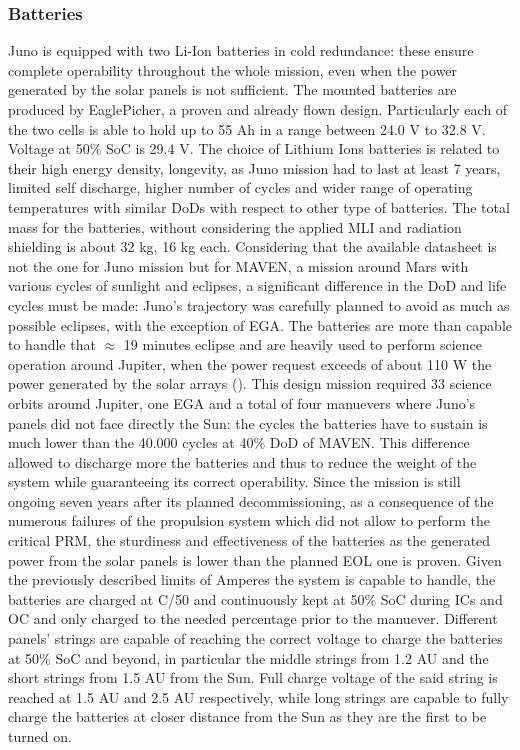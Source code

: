 \subsubsection{Batteries}
\label{subsubsec:Batteries}
Juno is equipped with two Li-Ion batteries in cold redundance: these ensure complete operability throughout the whole mission, even when the power generated by the solar panels is not sufficient.
\mref  
The mounted batteries are produced by EaglePicher, a proven and already flown design\cite{batteries_juno}. Particularly each of the two cells is able to hold up to 55 Ah in a range between 24.0 V to 32.8 V. Voltage at 50\% SoC is 29.4 V\cite{solar_panels_coef}. The choice of Lithium Ions batteries is related to their high energy density, longevity, as Juno mission had to last at least 7 years, limited self discharge, higher number of cycles and wider range of operating temperatures with similar DoDs with respect to other type of batteries.
The total mass for the batteries, without considering the applied MLI and radiation shielding is about 32 kg, 16 kg each. Considering that the available datasheet\cite{batteries_juno} is not the one for Juno mission but for MAVEN, a mission around Mars with various cycles of sunlight and eclipses, a significant difference in the DoD and life cycles must be made: Juno's trajectory was carefully planned to avoid as much as possible eclipses, with the exception of EGA. The batteries are more than capable to handle that $\approx$ 19 minutes eclipse\cite{juno_inner} and are heavily used to perform science operation around Jupiter, when the power request exceeds of about 110 W the power generated by the solar arrays
(\mref).
This design mission required 33 science orbits around Jupiter, one EGA and a total of four manuevers where Juno's panels did not face directly the Sun: the cycles the batteries have to sustain is much lower than the 40.000 cycles at 40\% DoD of MAVEN. This difference allowed to discharge more the batteries and thus to reduce the weight of the system while guaranteeing its correct operability. Since the mission is still ongoing seven years after its planned decommissioning, as a consequence of the numerous failures of the propulsion system which did not allow to perform the critical PRM, the sturdiness and effectiveness of the batteries as the generated power from the solar panels is lower than the planned EOL one is proven. Given the previously described limits of Amperes the system is capable to handle, the batteries are charged at C/50 and continuously kept at 50\% SoC during ICs and OC and only charged to the needed percentage prior to the manuever. Different panels' strings are capable of reaching the correct voltage to charge the batteries at 50\% SoC and beyond, in particular the middle strings from 1.2 AU and the short strings from 1.5 AU from the Sun. Full charge voltage of the said string is reached at 1.5 AU and 2.5 AU respectively, while long strings are capable to fully charge the batteries at closer distance from the Sun as they are the first to be turned on\cite{solar_panels_coef}. 

